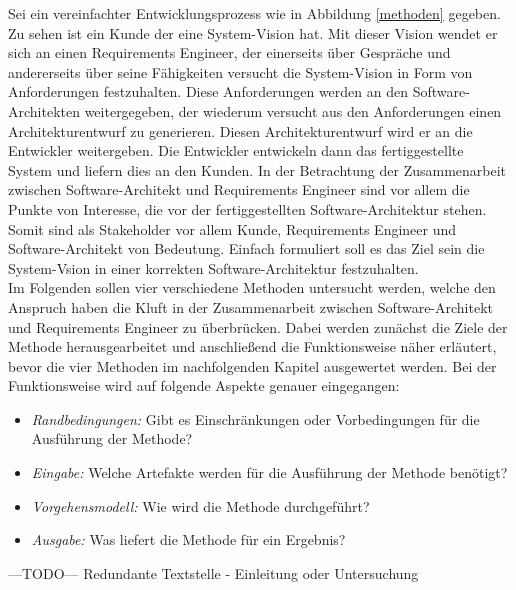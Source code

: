 Sei ein vereinfachter Entwicklungsprozess wie in Abbildung \ref{methoden} gegeben. Zu sehen ist ein Kunde der eine System-Vision hat. Mit dieser Vision wendet er sich an einen Requirements Engineer, der einerseits \"uber Gespr\"ache und andererseits \"uber seine F\"ahigkeiten versucht die System-Vision in Form von Anforderungen festzuhalten. Diese Anforderungen werden an den Software-Architekten weitergegeben, der wiederum versucht aus den Anforderungen einen Architekturentwurf zu generieren. Diesen Architekturentwurf wird er an die Entwickler weitergeben. Die Entwickler entwickeln dann das fertiggestellte System und liefern dies an den Kunden. In der Betrachtung der Zusammenarbeit zwischen Software-Architekt und Requirements Engineer sind vor allem die Punkte von Interesse, die vor der fertiggestellten Software-Architektur stehen. Somit sind als Stakeholder vor allem Kunde, Requirements Engineer und Software-Architekt von Bedeutung. Einfach formuliert soll es das Ziel sein die System-Vsion in einer korrekten Software-Architektur festzuhalten.\\

Im Folgenden sollen vier verschiedene Methoden untersucht werden, welche den Anspruch haben die Kluft in der Zusammenarbeit zwischen Software-Architekt und Requirements Engineer zu \"uberbr\"ucken. Dabei werden zun\"achst die Ziele der Methode herausgearbeitet und anschlie\ss{}end die Funktionsweise n\"aher erl\"autert, bevor die vier Methoden im nachfolgenden Kapitel ausgewertet werden. Bei der Funktionsweise wird auf folgende Aspekte genauer eingegangen: \\

\begin{itemize}
\item \textit{Randbedingungen:} Gibt es Einschr\"ankungen oder Vorbedingungen f\"ur die Ausf\"uhrung der Methode?
\item \textit{Eingabe:} Welche Artefakte werden f\"ur die Ausf\"uhrung der Methode ben\"otigt?
\item \textit{Vorgehensmodell:} Wie wird die Methode durchgef\"uhrt?
\item \textit{Ausgabe:} Was liefert die Methode f\"ur ein Ergebnis? \\
\end{itemize}

---TODO--- Redundante Textstelle - Einleitung oder Untersuchung\\




